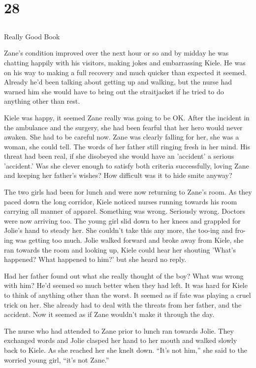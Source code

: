 \chapter{28}
\section{}
Really Good Book  

Zane's condition improved over the next hour or so and by midday he was chatting happily with his visitors, making jokes and embarrassing Kiele.  He was on his way to making a full recovery and much quicker than expected it seemed.  Already he'd been talking about getting up and walking, but the nurse had warned him she would have to bring out the straitjacket if he tried to do anything other than rest.

Kiele was happy, it seemed Zane really was going to be OK.  After the incident in the ambulance and the surgery, she had been fearful that her hero would never awaken.  She had to be careful now.  Zane was clearly falling for her, she was a woman, she could tell.  The words of her father still ringing fresh in her mind.  His threat had been real, if she disobeyed she would have an 'accident' a serious 'accident.'  Was she clever enough to satisfy both criteria successfully, loving Zane and keeping her father's wishes?  How difficult was it to hide smite anyway?

The two girls had been for lunch and were now returning to Zane's room.  As they paced down the long corridor, Kiele noticed nurses running towards his room carrying all manner of apparel.  Something was wrong.  Seriously wrong.  Doctors were now arriving too.  The young girl slid down to her knees and grappled for Jolie's hand to steady her.  She couldn't take this any more, the too-ing and fro-ing was getting too much.  Jolie walked forward and broke away from Kiele, she ran towards the room and looking up, Kiele could hear her shouting 'What's happened?  What happened to him?' but she heard no reply.  

Had her father found out what she really thought of the boy?  What was wrong with him?  He'd seemed so much better when they had left.  It was hard for Kiele to think of anything other than the worst.  It seemed as if fate was playing a cruel trick on her.  She already had to deal with the threats from her father, and the accident.  Now it seemed as if Zane wouldn't make it through the day.

The nurse who had attended to Zane prior to lunch ran towards Jolie.  They exchanged words and Jolie clasped her hand to her mouth and walked slowly back to Kiele.  As she reached her she knelt down.  ``It's not him,'' she said to the worried young girl, ``it's not Zane.''  

